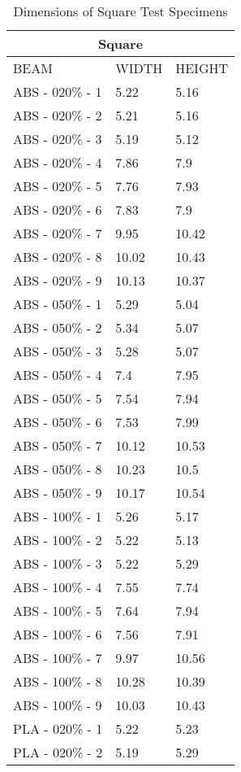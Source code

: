 \begin{longtable}{ | X | X | X | }
	\caption{Dimensions of Square Test Specimens}
	\label{tab:square_dims}
	\endhead
	\hline
	\multicolumn{3}{|c|}{Square} \\ \hline
	BEAM & WIDTH & HEIGHT \\ \hline
	ABS - 020\% - 1 & 5.22 & 5.16 \\ \hline
	ABS - 020\% - 2 & 5.21 & 5.16 \\ \hline
	ABS - 020\% - 3 & 5.19 & 5.12 \\ \hline
	ABS - 020\% - 4 & 7.86 & 7.9 \\ \hline
	ABS - 020\% - 5 & 7.76 & 7.93 \\ \hline
	ABS - 020\% - 6 & 7.83 & 7.9 \\ \hline
	ABS - 020\% - 7 & 9.95 & 10.42 \\ \hline
	ABS - 020\% - 8 & 10.02 & 10.43 \\ \hline
	ABS - 020\% - 9 & 10.13 & 10.37 \\ \hline
	ABS - 050\% - 1 & 5.29 & 5.04 \\ \hline
	ABS - 050\% - 2 & 5.34 & 5.07 \\ \hline
	ABS - 050\% - 3 & 5.28 & 5.07 \\ \hline
	ABS - 050\% - 4 & 7.4 & 7.95 \\ \hline
	ABS - 050\% - 5 & 7.54 & 7.94 \\ \hline
	ABS - 050\% - 6 & 7.53 & 7.99 \\ \hline
	ABS - 050\% - 7 & 10.12 & 10.53 \\ \hline
	ABS - 050\% - 8 & 10.23 & 10.5 \\ \hline
	ABS - 050\% - 9 & 10.17 & 10.54 \\ \hline
	ABS - 100\% - 1 & 5.26 & 5.17 \\ \hline
	ABS - 100\% - 2 & 5.22 & 5.13 \\ \hline
	ABS - 100\% - 3 & 5.22 & 5.29 \\ \hline
	ABS - 100\% - 4 & 7.55 & 7.74 \\ \hline
	ABS - 100\% - 5 & 7.64 & 7.94 \\ \hline
	ABS - 100\% - 6 & 7.56 & 7.91 \\ \hline
	ABS - 100\% - 7 & 9.97 & 10.56 \\ \hline
	ABS - 100\% - 8 & 10.28 & 10.39 \\ \hline
	ABS - 100\% - 9 & 10.03 & 10.43 \\ \hline
	PLA - 020\% - 1 & 5.22 & 5.23 \\ \hline
	PLA - 020\% - 2 & 5.19 & 5.29 \\ \hline

\end{longtable}
